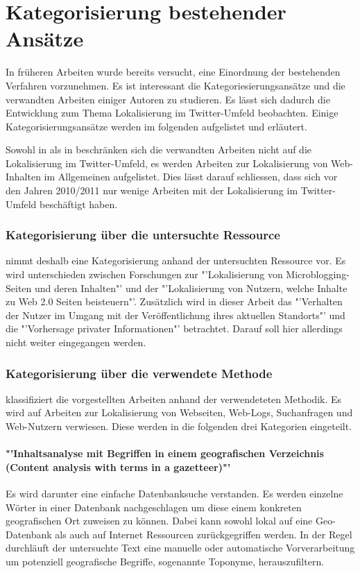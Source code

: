 		\section{Kategorisierung bestehender Ansätze}

		In früheren Arbeiten wurde bereits versucht, eine Einordnung der bestehenden Verfahren vorzunehmen. 
		Es ist interessant die Kategoriesierungsansätze und die verwandten Arbeiten einiger Autoren zu studieren.
		Es lässt sich dadurch die Entwicklung zum Thema Lokalisierung im Twitter-Umfeld beobachten. 
		Einige Kategorisierungsansätze werden im folgenden aufgelistet und erläutert.

		Sowohl in \cite{Hecht2011} als in \cite{Cheng2010} beschränken sich die verwandten Arbeiten nicht auf die Lokalisierung im Twitter-Umfeld, es werden Arbeiten zur Lokalisierung von Web-Inhalten im Allgemeinen aufgelistet. 
		Dies lässt darauf schliessen, dass sich vor den Jahren 2010/2011 nur wenige Arbeiten mit der Lokalisierung im Twitter-Umfeld beschäftigt haben.  
		
		\subsubsection{Kategorisierung über die untersuchte Ressource}
		\cite{Hecht2011} nimmt deshalb eine Kategorisierung anhand der untersuchten Ressource vor. 
		Es wird unterschieden zwischen Forschungen zur "'Lokalisierung von Microblogging-Seiten und deren Inhalten"' und der "'Lokalisierung von Nutzern, welche Inhalte zu Web 2.0 Seiten beisteuern"'. 
		Zusätzlich wird in dieser Arbeit das "'Verhalten der Nutzer im Umgang mit der Veröffentlichung ihres aktuellen Standorts"' und die "'Vorhersage privater Informationen"' betrachtet. Darauf soll hier allerdings nicht weiter eingegangen werden.      

		\subsubsection{Kategorisierung über die verwendete Methode}

		\cite{Cheng2010} klassifiziert die vorgestellten Arbeiten anhand der verwendeteten Methodik. 
		Es wird auf Arbeiten zur Lokalisierung von Webseiten, Web-Logs, Suchanfragen und Web-Nutzern verwiesen. 
		Diese werden in die folgenden drei Kategorien eingeteilt.

		\paragraph*{"'Inhaltsanalyse mit Begriffen in einem geografischen Verzeichnis (Content analysis with terms in a gazetteer)"'}  
		Es wird darunter eine einfache Datenbanksuche verstanden. 
		Es werden einzelne Wörter in einer Datenbank nachgeschlagen um diese einem konkreten geografischen Ort zuweisen zu können.
		Dabei kann sowohl lokal auf eine Geo-Datenbank als auch auf Internet Ressourcen zurückgegriffen werden.  
		In der Regel durchläuft der untersuchte Text eine manuelle oder automatische Vorverarbeitung um potenziell geografische Begriffe, sogenannte Toponyme, herauszufiltern. 

